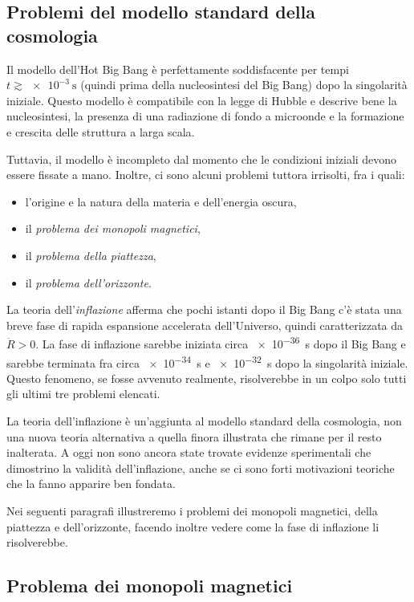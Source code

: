 \subsection{Problemi del modello standard della cosmologia}
\label{sec:problemi-cosmologia}

Il modello dell'Hot Big Bang è perfettamente soddisfacente per tempi \(t\gtrsim
\SI{e-3}{\second}\) (quindi prima della nucleosintesi del Big Bang) dopo la
singolarità iniziale.  Questo modello è compatibile con la legge di Hubble e
descrive bene la nucleosintesi, la presenza di una radiazione di fondo a
microonde e la formazione e crescita delle struttura a larga scala.

Tuttavia, il modello è incompleto dal momento che le condizioni iniziali devono
essere fissate a mano.  Inoltre, ci sono alcuni problemi tuttora irrisolti, fra
i quali:
\begin{itemize}
\item l'origine e la natura della materia e dell'energia oscura,
\item il \emph{problema dei monopoli magnetici},
\item il \emph{problema della piattezza},
\item il \emph{problema dell'orizzonte}.
\end{itemize}
La teoria dell'\emph{inflazione} afferma che pochi istanti dopo il Big Bang c'è
stata una breve fase di rapida espansione accelerata dell'Universo, quindi
caratterizzata da \(\ddot{R}>0\).  La fase di inflazione sarebbe iniziata circa
\SI{e-36}{\second} dopo il Big Bang e sarebbe terminata fra circa
\SI{e-34}{\second} e \SI{e-32}{\second} dopo la singolarità iniziale.  Questo
fenomeno, se fosse avvenuto realmente, risolverebbe in un colpo solo tutti gli
ultimi tre problemi elencati.

La teoria dell'inflazione è un'aggiunta al modello standard della cosmologia,
non una nuova teoria alternativa a quella finora illustrata che rimane per il
resto inalterata.  A oggi non sono ancora state trovate evidenze sperimentali
che dimostrino la validità dell'inflazione, anche se ci sono forti motivazioni
teoriche che la fanno apparire ben fondata.

Nei seguenti paragrafi illustreremo i problemi dei monopoli magnetici, della
piattezza e dell'orizzonte, facendo inoltre vedere come la fase di inflazione li
risolverebbe.

\subsection{Problema dei monopoli magnetici}
\label{sec:problema-monopoli}


